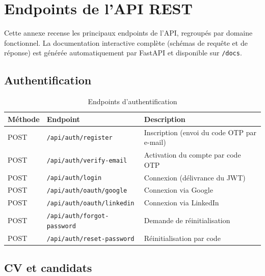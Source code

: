 \documentclass[12pt,a4paper]{report}
\begin{document}
\chapter{Endpoints de l'API REST}

Cette annexe recense les principaux endpoints de l'API, regroupés par domaine fonctionnel. La documentation interactive complète (schémas de requête et de réponse) est générée automatiquement par FastAPI et disponible sur \texttt{/docs}.

\section{Authentification}

\begin{table}[H]
\centering
\small
\caption{Endpoints d'authentification}
\begin{tabularx}{\textwidth}{llX}
\toprule
\textbf{Méthode} & \textbf{Endpoint} & \textbf{Description} \\
\midrule
POST & \texttt{/api/auth/register} & Inscription (envoi du code OTP par e-mail) \\
POST & \texttt{/api/auth/verify-email} & Activation du compte par code OTP \\
POST & \texttt{/api/auth/login} & Connexion (délivrance du JWT) \\
POST & \texttt{/api/auth/oauth/google} & Connexion via Google \\
POST & \texttt{/api/auth/oauth/linkedin} & Connexion via LinkedIn \\
POST & \texttt{/api/auth/forgot-password} & Demande de réinitialisation \\
POST & \texttt{/api/auth/reset-password} & Réinitialisation par code \\
\bottomrule
\end{tabularx}
\end{table}

\section{CV et candidats}
\end{document}
